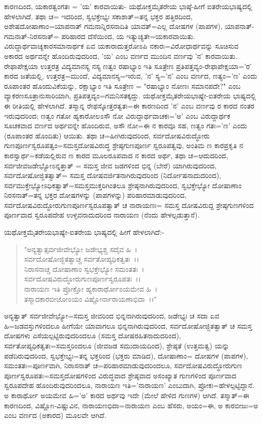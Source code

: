 ಕಾರಣದಿಂದ, ಯಕಾರತ್ವಂಗತಃ = 'ಯ' ಕಾರವಾಯಿತು- ಯಥೋಕ್ತಮೈತರೇಯ ಭಾಷ್ಠೆ-ಹೀಗೆ ಐತರೇಯಭಾಷ್ಯದಲ್ಲಿ ಹೇಳಲಾಗಿದೆ. ತಥಾ ಚ= ಇದರಿಂದ, ಸ್ವಭಕ್ತೇಭ್ಯಃ ಸಕಾಶಾತ್=ತನ್ನ ಭಕ್ತರ ಹತ್ತಿರದಿಂದ, ಅಶೇಷದೋಷಾಣಾಂ=ಯಾಪನಾತ್ ಗಮನಾನ್ನಿರಸನಾದಿತಿ ಯಾವತ್=ಎಲ್ಲ ದೋಷಗಳ (ಪಾಪಗಳ), ಯಾಪನಾತ್-ಗಮನಾತ್-ನಿರಸನಾತ್= ಪರಿಹಾರದ ದೆಸೆಯಿಂದ, ಯ ಇತ್ಯುಚ್ಯತೇ=ಯಕಾರವಾಯಿತು. ವಿರುದ್ಧಾರ್ಥವಾಚ್ಯಕಾರಸಮಾನಾರ್ಥಕ ಏವ ಯಕಾರಾದುತ್ತರೋಽಪಿ ನಕಾರಃ=ವಿರೋಧಾರ್ಥವನ್ನು ಸೂಚಿಸುವ ಅಕಾರದ ಅರ್ಥವನ್ನೇ ಹೊಂದಿರುವುದರಿಂದ, 'ಯ' ಎಂಬ ವರ್ಣದ ಮುಂದಿನ ವರ್ಣವು 'ನ' ಕಾರವಾಯಿತು. ರೇಫಾಪೇಕ್ಷಯಾ ಉತ್ತರತ್ರ ವಿದ್ಯಮಾನಸ್ಯ ನಸ್ಯ ಣತ್ವಂ ರಷಾಭ್ಯಾಂ ಇತಿ ಸೂತ್ರೇಣ ಪ್ರತಿಪತ್ತವ್ಯಂ-ರೇಫಾಪೇಕ್ಷಯಾ='ರ' ಕಾರದ ಜತೆಯಲ್ಲಿ, ಉತ್ತರತ್ರ=ಮುಂದೆ, ವಿದ್ಯಮಾನಸ್ಯ=ಇರುವ, 'ನ' ಸ್ಯ='ನ' ಎಂಬ ವರ್ಣದ, ಣತ್ಯಂ='ಣ' ಎಂದು ರೂಪಾಂತರ ಹೊಂದುವಿಕೆಯನ್ನು, ರಕ್ಷಾಭ್ಯಾಂ ಇತಿ ಸೂತ್ರೇಣ = "ರಷಾಭ್ಯಾಂ ನೋಣಃ ಸಮಾನಪದೇ?" ಎಂಬ ವ್ಯಾಕರಣಸೂತ್ರಾನುಸಾರಿಯಾಗಿ, ಪ್ರತಿಪತ್ತವ್ಯಂ=ಗಮನಿಸತಕ್ಕದ್ದು. ಯಥೋಕ್ತಮೈತರೇಯಭಾಷ್ಯೇ-ಐತರೇಯ ಭಾಷ್ಯದಲ್ಲಿ ಈ ರೀತಿಯಲ್ಲಿ ಹೇಳಲಾಗಿದೆ. ತಸ್ಮಾನ್ನ ರೇಫಸ್ಕೋತ್ತರತ್ವತಃ=ಈ ಕಾರಣದಿಂದ 'ನ' ಎಂಬ ವರ್ಣವು ರ ಕಾರದ ನಂತರ ಇರುವುದರಿಂದ; ಣತ್ವಂ ಗತೋ ಹ್ಯಕಾರೋಲಽಸೌ ನೋ ವಿರುದ್ದಾರ್ಥವಾಚಕಃ='ಅ' ಎಂಬ ವಿರುದ್ದಾರ್ಥಕ ಸೂಚಕವಾದ ವರ್ಣದ ಅರ್ಥವನ್ನೇ ಹೊಂದಿರುವ, ಅಸೌ ನೋ=ಈ ನ ಕಾರವೂ ಸಹ, ಣತ್ವಂ ಗತಃ='ಣ' ಎಂದು (ರೂಪಾಂತರ ಹೊಂದಿತು) ಆಯಿತು. ತಥಾ ಚ=ಹೀಗಿರುವುದರಿಂದ, ಸರ್ವದೋಷವಿರುದ್ಧೋರು ಗುಣಪೂರ್ಣಸ್ವರೂಪತ್ವಂ=ಸಮಸ್ತದೋಷವಿರುದ್ಧ ಶ್ರೇಷ್ಠಗುಣಪೂರ್ಣ ಸ್ವರೂಪತ್ವವು, ಅಂತಿಮ ಣ ಕಾರಪ್ರಕೃತಿ ನ ಕಾರಸ್ವಾರ್ಥ=ಕಡೆಯಲ್ಲಿರುವ ಣ ಕಾರದ ಮೂಲರೂಪವಾದ ನ ಕಾರದ ಅರ್ಥ, ತಥಾ ಚ=ಆದುದರಿಂದ, ಸರ್ವಜೀವಜಡೇಭ್ಯೋಽನ್ನತ್ತಾತ್ = ಸಮಸ್ತ ಜೀವ ಜಡಗಳಿಂದ ಭಿನ್ನ (ಬೇರೆ) ಯಾಗಿರುವುದರಿಂದ, ಸರ್ವದೋಷೋಜ್ಜಿತತ್ವಾತ್= ಸಮಸ್ತ ದೋಷವರ್ಜಿತನಾಗಿರುವುದರಿಂದ (ನಿರ್ದೋಷನಾದುದರಿಂದ), ಸರ್ವಮುಕ್ತೇಭ್ಯೋಽಧಿಕತ್ವಾತ್=ಸಮಸ್ತಮುಕ್ತರಿಗಿಂತಲೂ ಶ್ರೇಷ್ಠನಾಗಿರುವುದರಿಂದ, ಸ್ವಭಕ್ತೇಭ್ಯೋ ದೋಷಾಣಾಂ ನಿರಸನಾತ್=ತನ್ನ ಭಕ್ತರ ದೋಷಗಳನ್ನು (ಪಾಪಗಳನ್ನು) ಪರಿಹಾರಮಾಡುವುದರಿಂದ, ಸರ್ವದೋಷವಿರುದ್ಧೋರುಗುಣಪೂರ್ಣಸ್ವರೂಪತ್ವಾತ್ ಚ ನಾರಾಯಣಃ= ಸಮಸ್ತ ದೋಷವಿರುದ್ದ ಶ್ರೇಷ್ಠಗುಣಗಳಿಂದ ಪೂರ್ಣವಾದ ಸ್ವರೂಪದೇಹ ಉಳ್ಳವನಾದುದರಿಂದ ನಾರಾಯಣ (ನೆಂದು ಹೇಳಲ್ಪಡುತ್ತಾನೆ).

ಯಥೋಕ್ತಮೈತರೇಯಭಾಷ್ಯೇ-ಐತರೇಯ ಭಾಷ್ಯದಲ್ಲಿ ಹೀಗೆ ಹೇಳಲಾಗಿದೆ:-

\begin{verse}
"ಅನ್ಯತ್ವಾತ್ಸರ್ವಜೀವೇಭ್ಯೋ ಜಡೇಭ್ಯಶ್ಚ ಸದೈವ ಹಿ~।\\ ಸರ್ವದೋಷೋಜ್ಜಿತತ್ವಾಚ್ಚ ಸರ್ವತೋಪ್ಯಧಿಕತ್ವತಃ~।।\\ ನಿರಾಸನಾಚ್ಚ ದೋಷಾಣಾಂ ಸ್ವಭಕ್ತೇಭ್ಯೋ ಸಮಂತತಃ~।\\ ಸರ್ವದೋಷವಿರುದ್ಧೋರುಗುಣಪೂರ್ಣಸ್ವರೂಪತಃ~।।\\ ನಾರಾಯಣ ಇತಿ ಪ್ರೋಕ್ತೋ ಹ್ಯಕಾರಾರ್ಥೋಽಯಮೇವ ಹಿ~।\\ ತಸ್ಮಾದಕಾರಬೀಜೋಽಯಂ ವಿಷ್ಣೋರ್ನಾರಾಯಣಾಭಿದಾ~।।"
\end{verse}

ಅನ್ಯತ್ವಾತ್ ಸರ್ವಜೀವೇಭ್ಯೋ=ಸಮಸ್ತ ಜೀವರಿಂದ ಭಿನ್ನನಾಗಿರುವುದರಿಂದ, ಜಡೇಭ್ಯಃ ಚ ಸದಾ ಏವ ಹಿ=ಜಡವಸ್ತುಗಳಿಂದಲೂ ಹೀಗೆಯೇ ಯಾವಾಗಲೂ ಭಿನ್ನನಾಗಿರುವುದರಿಂದ, ಸರ್ವದೋಷೋಜ್ಜಿತತ್ವಾತ್ ಚ ಸಮಸ್ತ ದೋಷಗಳು ಎಸೆಯಲ್ಪಟ್ಟಿರುವುದರಿಂದಲೂ (ಸಮಸ್ತ ದೋಷರಹಿತನಾದುದರಿಂದ), ಸರ್ವತೋಪ್ಯಧಿಕತ್ವತಃ=ಸಮಸ್ತರಿಂದಲೂ (ಜೀವಜಡ ಸಮುದಾಯದಿಂದ), ಶ್ರೇಷ್ಠತೆ (ಉತ್ತಮತ್ವ) ಯನ್ನು ಪಡೆದಿರುವುದರಿಂದ, ಸ್ವಭಕ್ತೇಭ್ಯಃ=ತನ್ನ ಭಕ್ತರಿಂದ (ಭಕ್ತರು ಮಾಡಿದ), ದೋಷಾಣಾಂ= ದೋಷಗಳ (ಪಾಪಗಳ), ಸಮಂತತಃ=ಪೂರ್ಣವಾಗಿ, ನಿರಾಸನಾತ್ ಚ=ಪರಿಹಾರಮಾಡುವುದರಿಂದಲೂ, ಸರ್ವದೋಷವಿರುದ್ಧೋರುಗುಣ ಪೂರ್ಣಸ್ವರೂಪತಃ=ಸಮಸ್ತದೋಷಗಳಿಂದ ವಿರುದ್ಧವಾದ ಶ್ರೇಷ್ಠವಾದ ಅಸಂಖ್ಯಾತ ಗುಣಗಳಿಂದ ಪೂರ್ಣವಾದ ಸ್ವರೂಪದೇಹ ಹೊಂದಿರುವುದರಿಂದಲೂ, ನಾರಾಯಣ ಇತಿ='ನಾರಾಯಣ' ಎಂಬುದಾಗಿ, ಪ್ರೋಕಃ=ಹೇಳಲ್ಪಟ್ಟಿದ್ದಾನೆ. ಅ ಕಾರಾರ್ಥೋ ಅಯಮೇವ ಹಿ='ಅ' ಕಾರದ ಅರ್ಥವು ಇದೇ (ಮೇಲೆ ಹೇಳಿದ ಗುಣಗಳ) ಆಗಿದೆ. ತಸ್ಮಾತ್=ಈ ಕಾರಣದಿಂದ, ವಿಷ್ಣೋಃ-ವಿಷ್ಣುವಿನ, ನಾರಾಯಣಭಿದಾ=ನಾರಾಯಣ ಎಂಬ ಹೆಸರು, ಅಯಂ=ಈ, ಅ ಕಾರಬೀಜಃ=ಅ ಎಂಬ ವರ್ಣದ (ಅಕಾರದ) ಮೂಲವೇ ಆಗಿದೆ.

